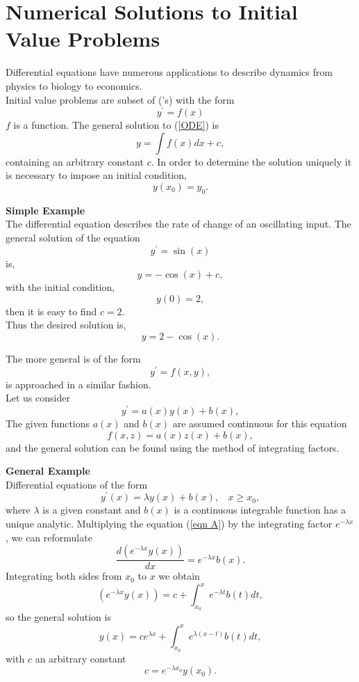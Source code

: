 \chapter{Numerical Solutions to Initial Value Problems}
Differential equations have numerous applications to describe dynamics from physics to biology to economics.\\

Initial value problems are subset of  ('s) with the form
\begin{equation}
\label{ODE}
y^{'}=f(x)
\end{equation}
$f$ is a function.  The general solution to (\ref{ODE})
is
\[
y=\int f(x)dx +c,
\]
 containing an arbitrary constant $c$.  In order to determine the solution uniquely it is necessary to impose an initial condition,
\begin{equation}
\label{Initial condition}
y(x_0)=y_0.
\end{equation}

\begin{example}
\textbf{Simple Example}\\
The differential equation describes the rate of change of an oscillating input. 
The general solution of the equation
\begin{equation}\label{ODE_sine} y^{'}=\sin(x) \end{equation}
is, 
\[ y=-\cos(x)+c, \]
with the initial condition,
\[y(0)=2,\]
then it is easy to find $c=2$.\\
Thus the desired solution is,
\[ y=2-\cos(x). \]
\end{example}

The more general  is of the form
\begin{equation}
\label{general ODE}
y^{'}=f(x,y),
\end{equation}
is approached in a similar fashion.\\
Let us consider
\[ y^{'} = a(x)y(x)+b(x),\]
The given functions $a(x)$ and $b(x)$ are assumed continuous for this equation
\[f(x,z)=a(x)z(x)+b(x), \] 
and the general solution can be found using the method of integrating factors.
\begin{example}
\textbf{General Example}\\
Differential equations of the form
\begin{equation}
\label{eqn A}
y^{'}(x)=\lambda y(x) +b(x), \ \ \ \ x \geq x_0,
\end{equation}
where  $\lambda$ is a given constant and $b(x)$ is a continuous integrable function has a unique analytic. Multiplying the equation (\ref{eqn A}) by the 
integrating factor $e^{-\lambda x}$, we can reformulate
\[\frac{d(e^{-\lambda x}y(x))}{dx}=e^{-\lambda x}b(x). \]
Integrating both sides from $x_0$ to $x$ we obtain
\[(e^{-\lambda x}y(x))=c+\int_{x_0}^{x}e^{-\lambda t}b(t)dt, \]
so the general solution is
\[y(x)=ce^{\lambda x}+\int_{x_0}^{x}e^{\lambda(x-t)}b(t)dt, \]
with $c$ an arbitrary constant
\[ c=e^{-\lambda x_0} y(x_0). \]
\end{example}

